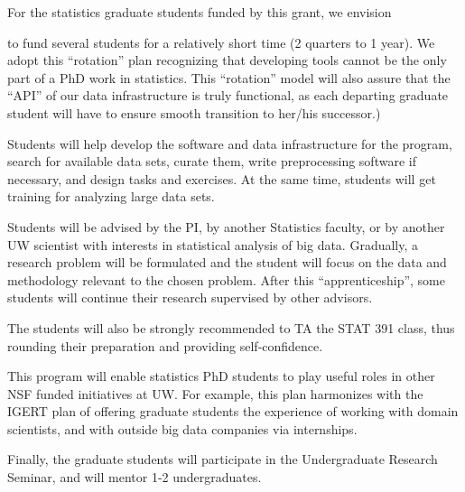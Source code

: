 For the statistics graduate students funded by this grant, we envision 
\bits
\item to fund several students for a relatively short time (2 quarters
  to 1 year). We adopt this ``rotation'' plan recognizing that developing 
tools cannot be the only part of a PhD work in statistics. 
This ``rotation'' model will also assure that the ``API'' of our data
infrastructure is truly functional, as each departing graduate student 
will have to ensure smooth transition to her/his successor.)
\item Students will help develop the software and data infrastructure for
  the program, search for available data sets, curate them, write
  preprocessing software if necessary, and design tasks and exercises. 
  At the same time, students will get training for analyzing large data sets. 
\item Students will be advised by the PI, by another Statistics faculty, or by another UW scientist with interests in statistical analysis of big data. Gradually, a research problem will be formulated and the student will
focus on the data and methodology relevant to the chosen problem. After this ``apprenticeship'', 
some students will continue their research supervised by other advisors. 
\item The students will also be strongly recommended to TA the STAT 391 class, thus rounding their preparation and providing self-confidence. 
\item This program will enable statistics PhD students to play useful roles in other NSF funded initiatives at UW. For 
example, this plan harmonizes with the IGERT plan of offering graduate students the experience of working with domain scientists, and with outside big data companies via internships. 
\item Finally, the graduate students will participate in the Undergraduate Research Seminar, and will mentor 1-2 undergraduates. 
 \eits

